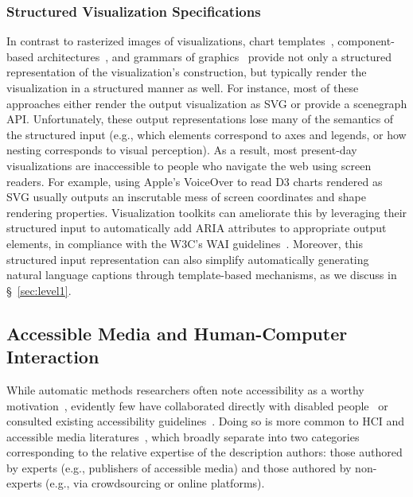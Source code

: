 \subsubsection{Structured Visualization Specifications}
In contrast to rasterized images of visualizations, chart templates~\cite{team_bokeh_2014}, component-based architectures~\cite{geveci_vtk_2012}, and grammars of graphics~\cite{satyanarayan_vega-lite_2017} provide not only a structured representation of the visualization's construction, but typically render the visualization in a structured manner as well.
For instance, most of these approaches either render the output visualization as \ac{SVG} or provide a scenegraph API.
Unfortunately, these output representations lose many of the semantics of the structured input (e.g., which elements correspond to axes and legends, or how nesting corresponds to visual perception).
As a result, most present-day visualizations are inaccessible to people who navigate the web using screen readers.
For example, using Apple's VoiceOver to read D3 charts rendered as \ac{SVG} usually outputs an inscrutable mess of screen coordinates and shape rendering properties.
Visualization toolkits can ameliorate this by leveraging their structured input to automatically add \ac{ARIA} attributes to appropriate output elements, in compliance with the \ac{W3C}'s \ac{WAI} guidelines~\cite{w3c_wai_2019}.
Moreover, this structured input representation can also simplify automatically generating natural language captions through template-based mechanisms, as we discuss in \S~\ref{sec:level1}.

\subsection{Accessible Media and Human-Computer Interaction}

While automatic methods researchers often note accessibility as a worthy motivation~\cite{demir_summarizing_2012, obeid_chart--text_2020, qian_formative_2020, qian_generating_2021, elzer_exploring_2005, elzer_browser_2007}, evidently few have collaborated directly with disabled people~\cite{choi_visualizing_2019, moraes_evaluating_2014} or consulted existing accessibility guidelines~\cite{lundgard_sociotechnical_2019}.
Doing so is more common to \ac{HCI} and accessible media literatures~\cite{morris_rich_2018, sharif_understanding_2021}, which broadly separate into two categories corresponding to the relative expertise of the description authors: those authored by {experts} (e.g., publishers of accessible media) and those authored by {non-experts} (e.g., via crowdsourcing or online platforms).

